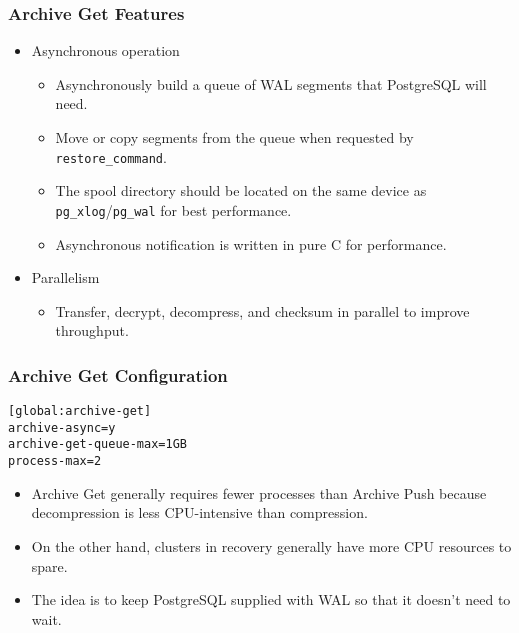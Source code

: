 \begin{frame}
    \frametitle{Archive Get Features}

    \begin{itemize}
        \item Asynchronous operation

        \begin{itemize}
            \item Asynchronously build a queue of WAL segments that PostgreSQL will need.\pause
            \item Move or copy segments from the queue when requested by \texttt{restore\_command}.\pause
            \item The spool directory should be located on the same device as \texttt{pg\_xlog}/\texttt{pg\_wal} for best performance.
            \item Asynchronous notification is written in pure C for performance.
        \end{itemize}

        \item Parallelism

        \begin{itemize}
            \item Transfer, decrypt, decompress, and checksum in parallel to improve throughput.
        \end{itemize}
    \end{itemize}
\end{frame}

\begin{frame}[fragile]
    \frametitle{Archive Get Configuration}

    \vspace{.75em}\begin{lstlisting}[title=pgbackrest.conf]
[global:archive-get]
archive-async=y
archive-get-queue-max=1GB
process-max=2
    \end{lstlisting}\pause\vspace{1em}

    \begin{itemize}
        \item Archive Get generally requires fewer processes than Archive Push because decompression is less CPU-intensive than compression.\pause
        \item On the other hand, clusters in recovery generally have more CPU resources to spare.\pause
        \item The idea is to keep PostgreSQL supplied with WAL so that it doesn't need to wait.
    \end{itemize}
\end{frame}

